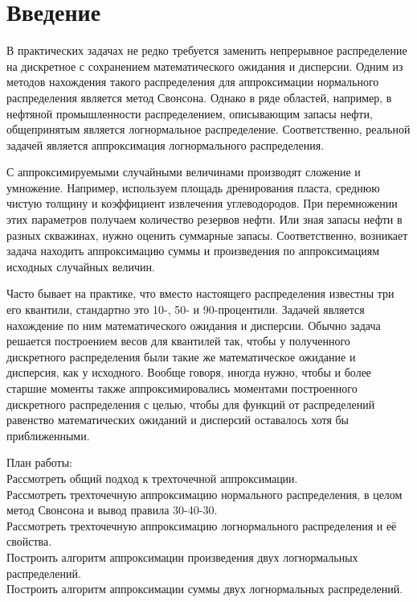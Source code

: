 \documentclass[12pt]{article}
\begin{document}
	
	
	
	\tableofcontents
	\pagebreak
	
	\section{Введение}
	
	В практических задачах не редко требуется заменить непрерывное распределение на
	дискретное с сохранением математического ожидания и дисперсии. Одним из методов
	нахождения такого распределения для аппроксимации нормального распределения является метод Свонсона. Однако в ряде областей, например, в нефтяной промышленности распределением, описывающим запасы нефти, общепринятым является логнормальное распределение. Соответственно, реальной задачей является аппроксимация логнормального распределения.
	
	С аппроксимируемыми случайными величинами производят сложение и умножение.
	Например, используем площадь дренирования пласта, среднюю чистую толщину и коэффициент извлечения углеводородов. При перемножении этих параметров получаем количество резервов нефти. Или зная запасы нефти в разных скважинах, нужно оценить суммарные запасы.
	Соответственно, возникает задача находить аппроксимацию суммы и произведения по аппроксимациям исходных случайных величин.
	
	Часто бывает на практике, что вместо настоящего распределения известны три его квантили, стандартно это 10-, 50- и 90-процентили. Задачей является нахождение по ним математического ожидания и дисперсии. Обычно задача решается построением весов для квантилей так, чтобы у полученного дискретного распределения были такие же математическое ожидание и дисперсия, как у исходного. Вообще говоря, иногда нужно, чтобы и более старшие моменты также аппроксимировались моментами построенного дискретного распределения с целью, чтобы для функций от распределений равенство математических ожиданий и дисперсий оставалось хотя бы приближенными.
	
	План работы:\\
	Рассмотреть общий подход к трехточечной аппроксимации.\\
	Рассмотреть трехточечную аппроксимацию нормального распределения, в целом метод Свонсона и вывод правила 30-40-30.\\
	Рассмотреть трехточечную аппроксимацию логнормального распределения и её  свойства.\\
	Построить алгоритм аппроксимации произведения двух логнормальных распределений.\\
	Построить алгоритм аппроксимации суммы двух логнормальных распределений.
	
\end{document}
